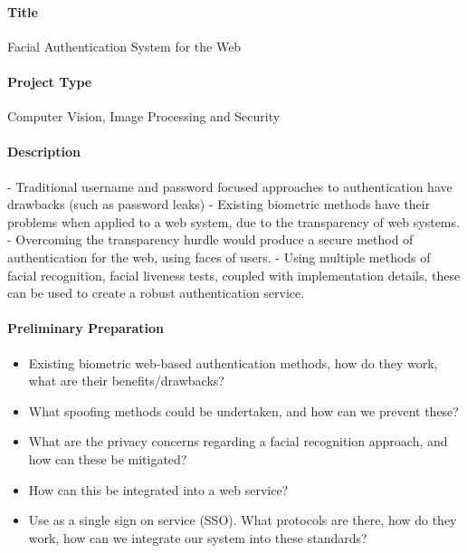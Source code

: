 \documentclass{article}
\begin{document}
    
    \paragraph{Title}
        Facial Authentication System for the Web
    \paragraph{Project Type}
        Computer Vision, Image Processing and Security
    \paragraph{Description}
        - Traditional username and password focused approaches to authentication have drawbacks (such as password leaks)
        - Existing biometric methods have their problems when applied to a web system, due to the transparency of web systems.
        - Overcoming the transparency hurdle would produce a secure method of authentication for the web, using faces of users.
        - Using multiple methods of facial recognition, facial liveness tests, coupled with implementation details, these can be used to create a robust
        authentication service.
    \paragraph{Preliminary Preparation}
        \begin{itemize}
            \item Existing biometric web-based authentication methods, how do they work, what are their benefits/drawbacks?
            \item What spoofing methods could be undertaken, and how can we prevent these?
            \item What are the privacy concerns regarding a facial recognition approach, and how can these be mitigated?
            \item How can this be integrated into a web service?
            \item Use as a single sign on service (SSO). What protocols are there, how do they work, how can we integrate our system into these standards?
        \end{itemize}
\end{document}
